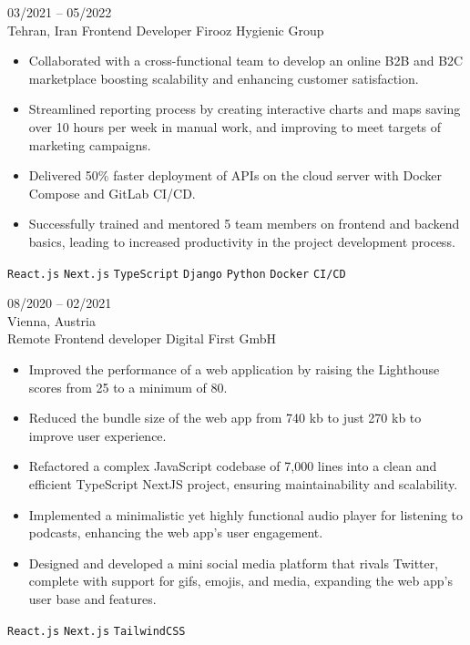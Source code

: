 \documentclass[8pt]{developercv} %
\begin{document}
\begin{entrylist}
        \entry
        {03/2021 -- 05/2022 \\ Tehran, Iran}
        {Frontend Developer}
        {Firooz Hygienic Group}
        {\vspace{-10pt}
            \begin{itemize}[noitemsep,topsep=0pt,parsep=0pt,partopsep=0pt, leftmargin=-1pt]
                \item Collaborated with a cross-functional team to develop an online B2B and B2C marketplace boosting scalability and enhancing customer satisfaction.
                \item Streamlined reporting process by creating interactive charts and maps saving over 10 hours per week in manual work, and improving to meet targets of marketing campaigns.
                \item Delivered 50\% faster deployment of APIs on the cloud server with Docker Compose and GitLab CI/CD.
                \item Successfully trained and mentored 5 team members on frontend and backend basics, leading to increased productivity in the project development process.
            \end{itemize}
            \texttt{React.js} \slashsep \texttt{Next.js} \slashsep \texttt{TypeScript} \slashsep \texttt{Django} \slashsep \texttt{Python} \slashsep \texttt{Docker} \slashsep \texttt{CI/CD}
        }

        \entry
        {08/2020 -- 02/2021 \\ Vienna, Austria \\ Remote}
        {Frontend developer}
        {Digital First GmbH}
        {\vspace{-10pt}
            \begin{itemize}[noitemsep,topsep=0pt,parsep=0pt,partopsep=0pt, leftmargin=-1pt]
                \item Improved the performance of a web application by raising the Lighthouse scores from 25 to a minimum of 80.
                \item Reduced the bundle size of the web app from 740 kb to just 270 kb to improve user experience.
                \item Refactored a complex JavaScript codebase of 7,000 lines into a clean and efficient TypeScript NextJS project, ensuring maintainability and scalability.
                \item Implemented a minimalistic yet highly functional audio player for listening to podcasts, enhancing the web app's user engagement.
                \item Designed and developed a mini social media platform that rivals Twitter, complete with support for gifs, emojis, and media, expanding the web app's user base and features.
            \end{itemize}
            \texttt{React.js} \slashsep \texttt{Next.js} \slashsep \texttt{TailwindCSS}
        }


\end{entrylist}
\end{document}
